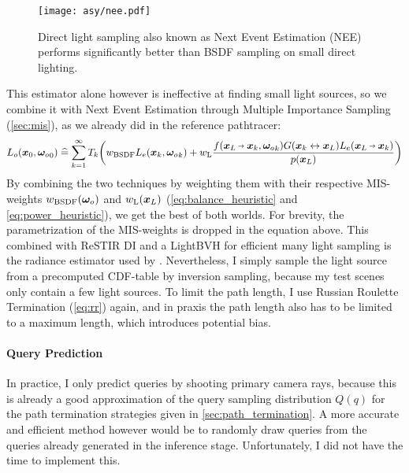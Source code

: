 \begin{figure}[htb!]
    \centering
    \texttt{[image: asy/nee.pdf]}
\caption{Direct light sampling also known as Next Event Estimation (NEE) performs significantly better than BSDF sampling on small direct lighting.}
\label{fig:nee}
\end{figure}
This estimator alone however is ineffective at finding small light sources, so we combine it with Next Event Estimation through Multiple Importance Sampling (\cref{sec:mis}), as we already did in the reference pathtracer:
\begin{equation}
\begin{aligned}
    L_o(\vec{x}_0, \wo_0)
    \hateq \sum_{k=1}^{\infty} T_k \left( w_\text{BSDF} L_e(\x_k, \wo_k) + w_\text{L} \frac{f(\pdir{L}{k}, \wo_k) \G{k}{L} L_e(\pdir{L}{k})}{p(\x_L)} \right)
\end{aligned}
\end{equation}
By combining the two techniques by weighting them with their respective MIS-weights $w_\text{BSDF}({\bm{\omega}_o})$ and $w_\text{L}(\bm{x}_L)$ (\cref{eq:balance_heuristic} and \cref{eq:power_heuristic}), we get the best of both worlds.
For brevity, the parametrization of the MIS-weights is dropped in the equation above.
This combined with ReSTIR DI \parencite{bitterli2020} and a LightBVH \parencite{moreau2019} for efficient many light sampling is the radiance estimator used by \textcite{muller2021}.
Nevertheless, I simply sample the light source from a precomputed CDF-table by inversion sampling, because my test scenes only contain a few light sources.
To limit the path length, I use Russian Roulette Termination (\cref{eq:rr}) again, and in praxis the path length also has to be limited to a maximum length, which introduces potential bias.

\paragraph{Query Prediction}
In practice, I only predict queries by shooting primary camera rays, because this is already a good approximation of the query sampling distribution $Q(q)$ for the path termination strategies given in \cref{sec:path_termination}.
A more accurate and efficient method however would be to randomly draw queries from the queries already generated in the inference stage.
Unfortunately, I did not have the time to implement this.

